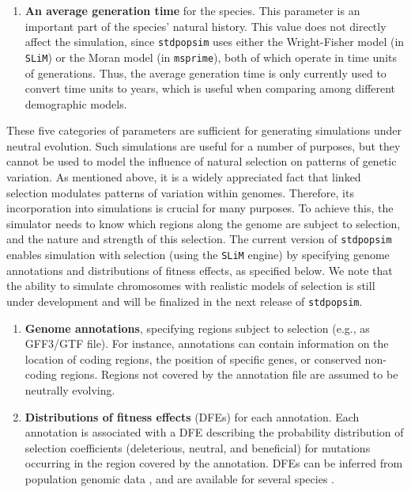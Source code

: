 \documentclass[hidelinks]{article}
\newcommand{\stdpopsim}{\texttt{stdpopsim}\xspace}
\begin{document}
\begin{enumerate}
\item
  \textbf{An average generation time} for the species.
  This parameter is an important part of the species' natural history.
  This value does not directly affect the simulation, since
  \stdpopsim uses either the Wright-Fisher model (in \texttt{SLiM}) or the Moran model (in \texttt{msprime}),
  both of which operate in time units of generations. 
  Thus, the average generation time is only currently used to convert time units to years, 
  which is useful when comparing among different demographic models.

\end{enumerate}


These five categories of parameters are sufficient for generating simulations
under neutral evolution. Such simulations are useful for a number of purposes,
but they cannot be used to model the influence of natural selection on patterns of genetic variation.
As mentioned above, it is a widely appreciated fact that linked selection modulates
patterns of variation within genomes.
Therefore, its incorporation into simulations is crucial for many purposes.
To achieve this, the simulator needs to know which regions along the genome are subject to selection,
and the nature and strength of this selection.
The current version of \stdpopsim enables simulation with selection
(using the \texttt{SLiM} engine)
by specifying genome annotations and distributions of fitness effects,
as specified below.
We note that the ability to simulate chromosomes with realistic models of
selection is still under development and will be finalized in the next release of \stdpopsim.

\begin{enumerate}
	\def\labelenumi{\arabic{enumi}.}
	\setcounter{enumi}{5}
	\item
	\textbf{Genome annotations}, specifying regions subject to selection (e.g., as GFF3/GTF file).
    For instance, annotations can contain information on the location of coding regions,
    the position of specific genes, or conserved non-coding regions.
    Regions not covered by the annotation file are assumed to be neutrally evolving.

	\item
	\textbf{Distributions of fitness effects} (DFEs) for each annotation.
    Each annotation is associated with a DFE describing
    the probability distribution of selection coefficients (deleterious, neutral, and beneficial)
    for mutations occurring in the region covered by the annotation.
    DFEs can be inferred from population genomic data \citep[reviewed in][]{Eyre-Walker2007},
    and are available for several species \citep[e.g.,][]{Ma2013, Huber2018}.
\end{enumerate}
\end{document}
